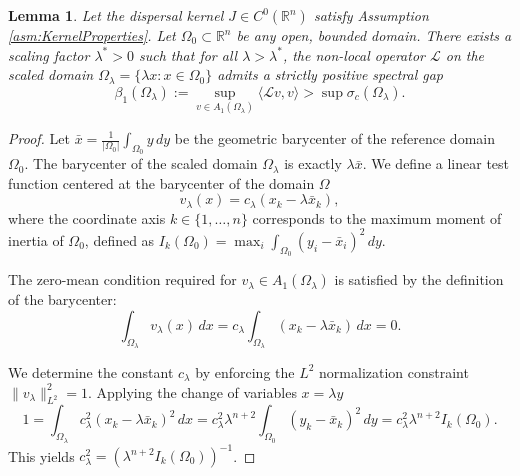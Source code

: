 \documentclass[11pt, a4paper]{article}
\theoremstyle{break}
\theoremstyle{break}
\theoremstyle{break}
\theoremstyle{break}
\theoremstyle{break}
\newtheorem{lem}{Lemma}[section]
\theoremstyle{break}
\theoremstyle{break}
\theoremstyle{break}
\theoremstyle{break}
\begin{document}
\begin{lem}
    \label{lem:large_domain_gap}
    Let the dispersal kernel $J \in C^0(\mathbb{R}^n)$ satisfy Assumption \ref{asm:KernelProperties}. Let $\Omega_0 \subset \mathbb{R}^n$ be any open, bounded domain. There exists a scaling factor $\lambda^* > 0$ such that for all $\lambda > \lambda^*$, the non-local operator $\mathcal{L}$ on the scaled domain $\Omega_\lambda = \{ \lambda x : x \in \Omega_0 \}$ admits a strictly positive spectral gap
    \begin{equation}
        \beta_1(\Omega_\lambda) := \sup_{v \in A_1(\Omega_\lambda)} \langle \mathcal{L}v, v \rangle > \sup \sigma_c(\Omega_\lambda).
    \end{equation}
\end{lem}

\begin{proof}
    
    Let $\bar{x} = \frac{1}{|\Omega_0|} \int_{\Omega_0} y \, dy$ be the geometric barycenter of the reference domain $\Omega_0$. The barycenter of the scaled domain $\Omega_\lambda$ is exactly $\lambda \bar{x}$. We define a linear test function centered at the barycenter of the domain $\Omega$
    \begin{equation}
        v_\lambda(x) = c_\lambda (x_k - \lambda \bar{x}_k),
    \end{equation}
    where the coordinate axis $k \in \{1, \dots, n\}$ corresponds to the maximum moment of inertia of $\Omega_0$, defined as $I_k(\Omega_0) = \max_i \int_{\Omega_0} (y_i - \bar{x}_i)^2 \, dy$.
    
    The zero-mean condition required for $v_\lambda \in A_1(\Omega_\lambda)$ is satisfied by the definition of the barycenter:
    \begin{equation}
        \int_{\Omega_\lambda} v_\lambda(x) \, dx = c_\lambda \int_{\Omega_\lambda} (x_k - \lambda \bar{x}_k) \, dx = 0.
    \end{equation}
    
    We determine the constant $c_\lambda$ by enforcing the $L^2$ normalization constraint $\|v_\lambda\|_{L^2}^2 = 1$. Applying the change of variables $x = \lambda y$
    \begin{equation}
        1 = \int_{\Omega_\lambda} c_\lambda^2 (x_k - \lambda \bar{x}_k)^2 \, dx = c_\lambda^2 \lambda^{n+2} \int_{\Omega_0} (y_k - \bar{x}_k)^2 \, dy = c_\lambda^2 \lambda^{n+2} I_k(\Omega_0).
    \end{equation}
    This yields $c_\lambda^2 = (\lambda^{n+2} I_k(\Omega_0))^{-1}$.
    

\end{proof}
\end{document}
